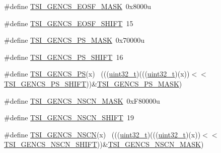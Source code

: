 \begin{DoxyCompactItemize}
\item 
\#define \hyperlink{group___t_s_i___register___masks_ga820de7fe1ecba9a42260e304554b389f}{T\+S\+I\+\_\+\+G\+E\+N\+C\+S\+\_\+\+E\+O\+S\+F\+\_\+\+M\+A\+SK}~0x8000u
\item 
\#define \hyperlink{group___t_s_i___register___masks_ga9a2e8c68bfb60312ebdeea4f069d9086}{T\+S\+I\+\_\+\+G\+E\+N\+C\+S\+\_\+\+E\+O\+S\+F\+\_\+\+S\+H\+I\+FT}~15
\item 
\#define \hyperlink{group___t_s_i___register___masks_ga3c608c250c31872d206e9c18eea97799}{T\+S\+I\+\_\+\+G\+E\+N\+C\+S\+\_\+\+P\+S\+\_\+\+M\+A\+SK}~0x70000u
\item 
\#define \hyperlink{group___t_s_i___register___masks_gaae1f3b081a9c92fefe10bd3ec1f40734}{T\+S\+I\+\_\+\+G\+E\+N\+C\+S\+\_\+\+P\+S\+\_\+\+S\+H\+I\+FT}~16
\item 
\#define \hyperlink{group___t_s_i___register___masks_ga6edb5dbc41896c6d33fd1395d9e1a17d}{T\+S\+I\+\_\+\+G\+E\+N\+C\+S\+\_\+\+PS}(x)                                                ~(((\hyperlink{_p_e___types_8h_a33594304e786b158f3fb30289278f5af}{uint32\+\_\+t})(((\hyperlink{_p_e___types_8h_a33594304e786b158f3fb30289278f5af}{uint32\+\_\+t})(x))$<$$<$\hyperlink{group___t_s_i___register___masks_gaae1f3b081a9c92fefe10bd3ec1f40734}{T\+S\+I\+\_\+\+G\+E\+N\+C\+S\+\_\+\+P\+S\+\_\+\+S\+H\+I\+FT}))\&\hyperlink{group___t_s_i___register___masks_ga3c608c250c31872d206e9c18eea97799}{T\+S\+I\+\_\+\+G\+E\+N\+C\+S\+\_\+\+P\+S\+\_\+\+M\+A\+SK})
\item 
\#define \hyperlink{group___t_s_i___register___masks_ga3a420e0ae200374eca1a185b535cc0ba}{T\+S\+I\+\_\+\+G\+E\+N\+C\+S\+\_\+\+N\+S\+C\+N\+\_\+\+M\+A\+SK}~0x\+F80000u
\item 
\#define \hyperlink{group___t_s_i___register___masks_gab90732bc69449d59a0fc0f3c208caf21}{T\+S\+I\+\_\+\+G\+E\+N\+C\+S\+\_\+\+N\+S\+C\+N\+\_\+\+S\+H\+I\+FT}~19
\item 
\#define \hyperlink{group___t_s_i___register___masks_ga88b69a519adf7824cdb68192fb98b684}{T\+S\+I\+\_\+\+G\+E\+N\+C\+S\+\_\+\+N\+S\+CN}(x)                                            ~(((\hyperlink{_p_e___types_8h_a33594304e786b158f3fb30289278f5af}{uint32\+\_\+t})(((\hyperlink{_p_e___types_8h_a33594304e786b158f3fb30289278f5af}{uint32\+\_\+t})(x))$<$$<$\hyperlink{group___t_s_i___register___masks_gab90732bc69449d59a0fc0f3c208caf21}{T\+S\+I\+\_\+\+G\+E\+N\+C\+S\+\_\+\+N\+S\+C\+N\+\_\+\+S\+H\+I\+FT}))\&\hyperlink{group___t_s_i___register___masks_ga3a420e0ae200374eca1a185b535cc0ba}{T\+S\+I\+\_\+\+G\+E\+N\+C\+S\+\_\+\+N\+S\+C\+N\+\_\+\+M\+A\+SK})

\end{DoxyCompactItemize}
